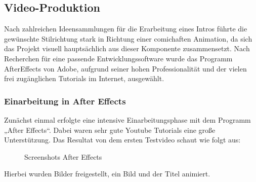 \subsection{Video-Produktion}
Nach zahlreichen Ideensammlungen für die Erarbeitung eines Intros führte die gewünschte Stilrichtung stark in Richtung einer comichaften Animation, da sich das Projekt visuell hauptsächlich aus dieser Komponente zusammensetzt. Nach Recherchen für eine passende Entwicklungssoftware wurde das Programm AfterEffects von Adobe, aufgrund seiner hohen Professionalität und der vielen frei zugänglichen Tutorials im Internet, ausgewählt.

\subsubsection{Einarbeitung in After Effects}
Zunächst einmal erfolgte eine intensive Einarbeitungsphase mit dem Programm „After Effects“. Dabei waren sehr gute Youtube Tutorials eine große Unterstützung. 
Das Resultat von dem ersten Testvideo schaut wie folgt aus: 
\begin{figure}[h]
\centering
\qquad
\caption{Screenshots After Effects}%
 \label{fig:Screenshots After Effect}%
\end{figure}
Hierbei wurden Bilder freigestellt, ein Bild und der Titel animiert.  


